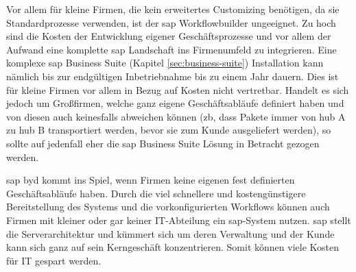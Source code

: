 
Vor allem für kleine Firmen, die kein erweitertes Customizing benötigen, da sie Standardprozesse verwenden, ist der \gls{sap} Workflowbuilder ungeeignet. Zu hoch sind die Kosten der Entwicklung eigener Geschäftsprozesse und vor allem der Aufwand eine komplette \gls{sap} Landschaft ins Firmenumfeld zu integrieren. Eine komplexe \gls{sap} Business Suite (Kapitel \ref{sec:business-suite}) Installation kann nämlich bis zur endgültigen Inbetriebnahme bis zu einem Jahr dauern. Dies ist für kleine Firmen vor allem in Bezug auf Kosten nicht vertretbar. Handelt es sich jedoch um Großfirmen, welche ganz eigene Geschäftsabläufe definiert haben und von diesen auch keinesfalls abweichen können (\gls{zb}, dass Pakete immer von \gls{hub} A zu \gls{hub} B transportiert werden, bevor sie zum Kunde ausgeliefert werden), so sollte auf jedenfall eher die \gls{sap} Business Suite Lösung in Betracht gezogen werden.

\gls{sap} \gls{byd} kommt ins Spiel, wenn Firmen keine eigenen fest definierten Geschäftsabläufe haben. Durch die viel schnellere und kostengünstigere Bereitstellung des Systems und die vorkonfigurierten Workflows können auch Firmen mit kleiner oder gar keiner IT-Abteilung ein \gls{sap}-System nutzen. \gls{sap} stellt die Serverarchitektur und kümmert sich um deren Verwaltung und der Kunde kann sich ganz auf sein Kerngeschäft konzentrieren. Somit können viele Kosten für IT gespart werden.

